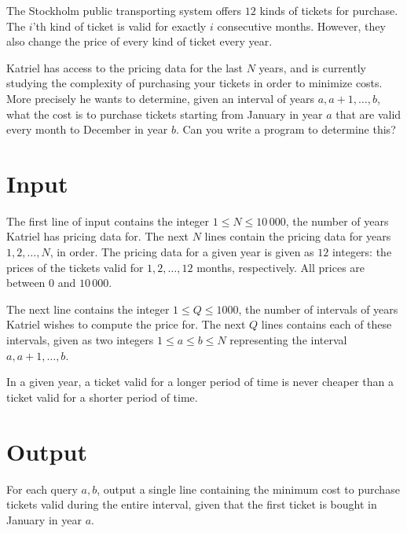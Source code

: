 The Stockholm public transporting system offers $12$ kinds of tickets for purchase.
The $i$'th kind of ticket is valid for exactly $i$ consecutive months.
However, they also change the price of every kind of ticket every year.

Katriel has access to the pricing data for the last $N$ years, and is currently studying the complexity of purchasing your tickets in order to minimize costs.
More precisely he wants to determine, given an interval of years $a, a + 1, \dots, b$, what the cost is to purchase tickets starting from January in year $a$ that are valid every month to December in year $b$.
Can you write a program to determine this?

\section*{Input}
The first line of input contains the integer $1 \le N \le 10\,000$, the number of years Katriel has pricing data for.
The next $N$ lines contain the pricing data for years $1, 2, \dots, N$, in order.
The pricing data for a given year is given as $12$ integers: the prices of the tickets valid for $1, 2, \dots, 12$ months, respectively.
All prices are between $0$ and $10\,000$.

The next line contains the integer $1 \le Q \le 1000$, the number of intervals of years Katriel wishes to compute the price for.
The next $Q$ lines contains each of these intervals, given as two integers $1 \le a \le b \le N$ representing the interval $a, a + 1, \dots, b$.

In a given year, a ticket valid for a longer period of time is never cheaper than a ticket valid for a shorter period of time.

\section*{Output}
For each query $a, b$, output a single line containing the minimum cost to purchase tickets valid during the entire interval, given that the first ticket is bought in January in year $a$.
